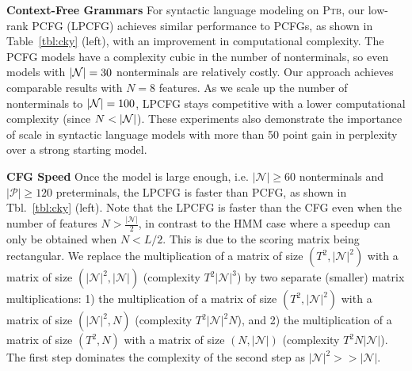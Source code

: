 \documentclass{article}
\begin{document}

\textbf{Context-Free Grammars}
For syntactic language modeling on \textsc{Ptb}, our low-rank PCFG (LPCFG) achieves similar performance to PCFGs, as shown in Table~\ref{tbl:cky} (left), with an improvement in computational complexity. The PCFG models have a complexity cubic in the number of nonterminals, so even models with $|\mathcal{N}|=30$ nonterminals are relatively
costly. Our approach achieves comparable results with $N=8$ features. As we scale up the number of nonterminals to $|\mathcal{N}| = 100$, LPCFG stays competitive with a lower computational complexity (since $N < |\mathcal{N}|$). These experiments also demonstrate the importance of scale in syntactic language models with more than 50 point gain in perplexity over a strong starting model.

\textbf{CFG Speed}
Once the model is large enough, i.e. $|\mathcal{N}|\ge 60$ nonterminals and
$|\mathcal{P}|\ge 120$ preterminals, the LPCFG is faster than PCFG,
as shown in Tbl.~\ref{tbl:cky} (left).
Note that the LPCFG is faster than the CFG even when the number of features
$N>\frac{|\mathcal{N}|}{2}$, in contrast to the HMM case where a speedup can only
be obtained when $N < L/2$.
This is due to the scoring matrix being rectangular.
We replace the multiplication of a matrix of size $(T^2,|\mathcal{N}|^2)$
with a matrix of size $(|\mathcal{N}|^2, |\mathcal{N}|)$
(complexity $T^2|\mathcal{N}|^3$) by two separate (smaller) matrix multiplications:
1) the multiplication of a matrix of size $(T^2,|\mathcal{N}|^2)$
with a matrix of size $(|\mathcal{N}|^2, N)$ (complexity $T^2|\mathcal{N}|^2N$),
and 2) the multiplication of a matrix of size $(T^2,N)$ with a matrix of size
$(N, |\mathcal{N}|)$ (complexity $T^2N|\mathcal{N}|$).
The first step dominates the complexity of the second step as $|\mathcal{N}|^2>>|\mathcal{N}|$.
\end{document}
